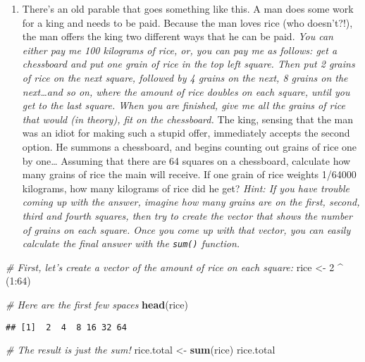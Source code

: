 \documentclass[]{book}
\newenvironment{Shaded}{\begin{snugshade}}{\end{snugshade}}
\newcommand{\KeywordTok}[1]{\textcolor[rgb]{0.13,0.29,0.53}{\textbf{{#1}}}}
\newcommand{\DecValTok}[1]{\textcolor[rgb]{0.00,0.00,0.81}{{#1}}}
\newcommand{\StringTok}[1]{\textcolor[rgb]{0.31,0.60,0.02}{{#1}}}
\newcommand{\CommentTok}[1]{\textcolor[rgb]{0.56,0.35,0.01}{\textit{{#1}}}}
\newcommand{\NormalTok}[1]{{#1}}
\providecommand{\tightlist}{%
  \setlength{\itemsep}{0pt}\setlength{\parskip}{0pt}}
\begin{document}
\begin{enumerate}
\def\labelenumi{\arabic{enumi}.}
\setcounter{enumi}{3}
\tightlist
\item
  There's an old parable that goes something like this. A man does some
  work for a king and needs to be paid. Because the man loves rice (who
  doesn't?!), the man offers the king two different ways that he can be
  paid. \emph{You can either pay me 100 kilograms of rice, or, you can
  pay me as follows: get a chessboard and put one grain of rice in the
  top left square. Then put 2 grains of rice on the next square,
  followed by 4 grains on the next, 8 grains on the next\ldots{}and so
  on, where the amount of rice doubles on each square, until you get to
  the last square. When you are finished, give me all the grains of rice
  that would (in theory), fit on the chessboard.} The king, sensing that
  the man was an idiot for making such a stupid offer, immediately
  accepts the second option. He summons a chessboard, and begins
  counting out grains of rice one by one\ldots{} Assuming that there are
  64 squares on a chessboard, calculate how many grains of rice the main
  will receive. If one grain of rice weights 1/64000 kilograms, how many
  kilograms of rice did he get? \emph{Hint: If you have trouble coming
  up with the answer, imagine how many grains are on the first, second,
  third and fourth squares, then try to create the vector that shows the
  number of grains on each square. Once you come up with that vector,
  you can easily calculate the final answer with the \texttt{sum()}
  function.}
\end{enumerate}

\begin{Shaded}
\begin{Highlighting}[]
\CommentTok{# First, let's create a vector of the amount of rice on each square:}
\NormalTok{rice <-}\StringTok{ }\DecValTok{2} \NormalTok{^}\StringTok{ }\NormalTok{(}\DecValTok{1}\NormalTok{:}\DecValTok{64}\NormalTok{)}

\CommentTok{# Here are the first few spaces}
\KeywordTok{head}\NormalTok{(rice)}
\end{Highlighting}
\end{Shaded}

\begin{verbatim}
## [1]  2  4  8 16 32 64
\end{verbatim}

\begin{Shaded}
\begin{Highlighting}[]
\CommentTok{# The result is just the sum!}
\NormalTok{rice.total <-}\StringTok{ }\KeywordTok{sum}\NormalTok{(rice)}
\NormalTok{rice.total}
\end{Highlighting}
\end{Shaded}
\end{document}
